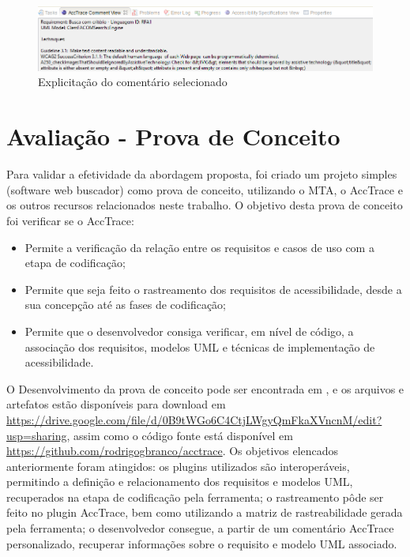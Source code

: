 \documentclass[runningheads,a4paper]{llncs}
\begin{document}
\begin{figure}[h!]
\centering
\includegraphics[scale=0.45]{./img/commentview.png}
\caption{Explicitação do comentário selecionado}
\label{fig:commentview}
\end{figure}

\section{Avaliação - Prova de Conceito}

Para validar a efetividade da abordagem proposta, foi criado um projeto simples (software web buscador) como prova de conceito, utilizando o MTA, o AccTrace e os outros recursos relacionados neste trabalho. O objetivo desta prova de conceito foi verificar se o AccTrace:

\begin{itemize}
  \item Permite a verificação da relação entre os requisitos e casos de uso com a etapa de codificação;
  \item Permite que seja feito o rastreamento dos requisitos de acessibilidade, desde a sua concepção até as fases de codificação;
  \item Permite que o desenvolvedor consiga verificar, em nível de código, a associação dos requisitos, modelos UML e técnicas de implementação de acessibilidade.
\end{itemize}

O Desenvolvimento da prova de conceito pode ser encontrada em \cite{branco:13},
e os arquivos e artefatos estão disponíveis para download em
\url{https://drive.google.com/file/d/0B9tWGo6C4CtjLWgyQmFkaXVncnM/edit?usp=sharing},
assim como o código fonte está disponível em
\url{https://github.com/rodrigogbranco/acctrace}. Os objetivos elencados anteriormente foram atingidos:
os plugins utilizados são interoperáveis, permitindo a definição e relacionamento dos requisitos e modelos UML, recuperados na etapa de codificação pela ferramenta; o rastreamento pôde ser feito no plugin AccTrace, bem como utilizando a matriz de rastreabilidade gerada pela ferramenta; o desenvolvedor consegue, a partir de um comentário AccTrace personalizado, recuperar informações sobre o requisito e modelo UML associado.
\end{document}
